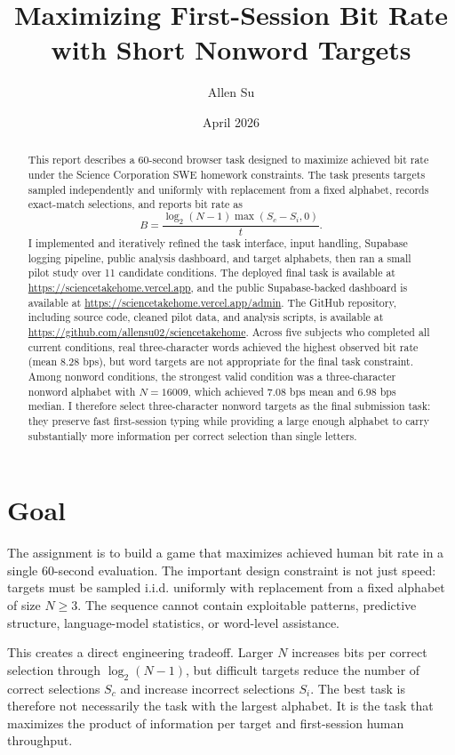 \documentclass[11pt]{article}
\title{Maximizing First-Session Bit Rate with Short Nonword Targets}
\author{Allen Su}
\date{April 2026}
\begin{document}
\maketitle

\begin{abstract}
This report describes a 60-second browser task designed to maximize achieved bit rate under the Science Corporation SWE homework constraints. The task presents targets sampled independently and uniformly with replacement from a fixed alphabet, records exact-match selections, and reports bit rate as
\[
B = \frac{\log_2(N - 1)\max(S_c - S_i, 0)}{t}.
\]
I implemented and iteratively refined the task interface, input handling, Supabase logging pipeline, public analysis dashboard, and target alphabets, then ran a small pilot study over 11 candidate conditions. The deployed final task is available at \url{https://sciencetakehome.vercel.app}, and the public Supabase-backed dashboard is available at \url{https://sciencetakehome.vercel.app/admin}. The GitHub repository, including source code, cleaned pilot data, and analysis scripts, is available at \url{https://github.com/allensu02/sciencetakehome}. Across five subjects who completed all current conditions, real three-character words achieved the highest observed bit rate (mean 8.28 bps), but word targets are not appropriate for the final task constraint. Among nonword conditions, the strongest valid condition was a three-character nonword alphabet with \(N=16009\), which achieved 7.08 bps mean and 6.98 bps median. I therefore select three-character nonword targets as the final submission task: they preserve fast first-session typing while providing a large enough alphabet to carry substantially more information per correct selection than single letters.
\end{abstract}

\section{Goal}

The assignment is to build a game that maximizes achieved human bit rate in a single 60-second evaluation. The important design constraint is not just speed: targets must be sampled i.i.d. uniformly with replacement from a fixed alphabet of size \(N \geq 3\). The sequence cannot contain exploitable patterns, predictive structure, language-model statistics, or word-level assistance.

This creates a direct engineering tradeoff. Larger \(N\) increases bits per correct selection through \(\log_2(N-1)\), but difficult targets reduce the number of correct selections \(S_c\) and increase incorrect selections \(S_i\). The best task is therefore not necessarily the task with the largest alphabet. It is the task that maximizes the product of information per target and first-session human throughput.
\end{document}
